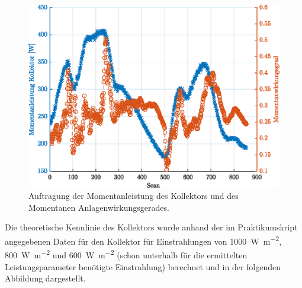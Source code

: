 \begin{figure}[H]
	\centering
	\includegraphics[height=0.3\textheight]{../DATA/LeistungTime.eps}
	\caption[Auftragung der Momentanleistung des Kollektors und des Momentanen Anlagenwirkungsgerades]{Auftragung der Momentanleistung des Kollektors und des Momentanen Anlagenwirkungsgerades.}
	\label{fig:Momentanleistung}
\end{figure}

Die theoretische Kennlinie des Kollektors wurde anhand der im Praktikumskript angegebenen Daten für den Kollektor für Einstrahlungen von \SI{1000}{\watt\per\meter\squared}, \SI{800}{\watt\per\meter\squared} und \SI{600}{\watt\per\meter\squared} (schon unterhalb für die ermittelten Leistungsparameter benötigte Einstrahlung) berechnet und in der folgenden Abbildung dargestellt.

